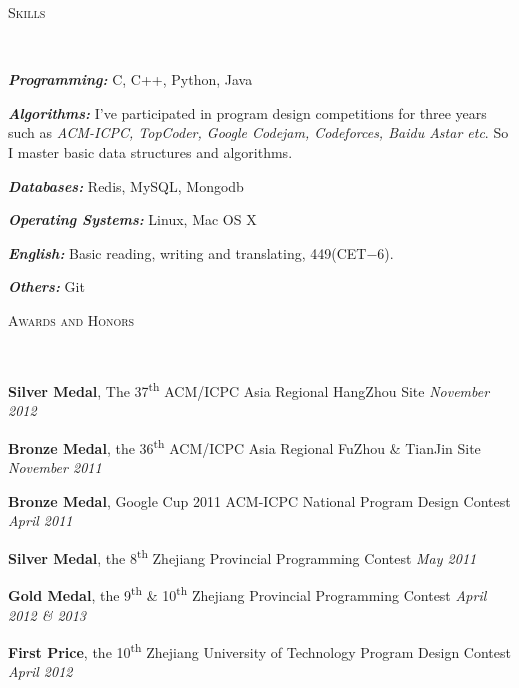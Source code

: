 ﻿\documentclass[9pt]{article}
\newenvironment{changemargin}[2]{%
  \begin{list}{}{%
    \setlength{\topsep}{0pt}%
    \setlength{\leftmargin}{#1}%
    \setlength{\rightmargin}{#2}%
    \setlength{\listparindent}{\parindent}%
    \setlength{\itemindent}{\parindent}%
    \setlength{\parsep}{\parskip}%
  }%
  \item[]}{\end{list}
}
\newcommand{\lineover}{
	\begin{changemargin}{-0.05in}{-0.05in}
		\vspace*{-8pt}
		\hrulefill \\
		\vspace*{-2pt}
	\end{changemargin}
}
\newcommand{\header}[1]{
	\begin{changemargin}{-0.5in}{-0.5in}
		\scshape{#1}\\
  	\lineover
	\end{changemargin}
}
\newenvironment{body} {
	\vspace*{-16pt}
	\begin{changemargin}{-0.25in}{-0.5in}
  }	
	{\end{changemargin}
}
\newcommand\nth{\textsuperscript{th}} %
\begin{document}
\smallskip


\header{Skills}

\begin{body}
	\vspace{14pt}
	\emph{\textbf{Programming:}}{} C, C++, Python, Java \\
	\medskip

    \emph{\textbf{Algorithms:}}{} I've participated in program design competitions for three years such as \emph{ACM-ICPC,
TopCoder, Google Codejam, Codeforces, Baidu Astar etc}. So I master basic data structures and algorithms.\\
    \medskip

    \emph{\textbf{Databases:}}{} Redis, MySQL, Mongodb \\
    \medskip

    \emph{\textbf{Operating Systems:}}{} Linux, Mac OS X \\
    \medskip

    \emph{\textbf{English:}}{} Basic reading, writing and translating, 449(CET$-$6).\\
    \medskip

    \emph{\textbf{Others:}}{} Git

\end{body}

\smallskip

\header{Awards and Honors}

\begin{body}
	\vspace{14pt}

	\textbf{Silver Medal}, The 37\nth{} ACM/ICPC Asia Regional HangZhou Site \hfill{} \emph{November 2012}\\
	\smallskip

	\textbf{Bronze Medal}, the 36\nth{} ACM/ICPC Asia Regional FuZhou \& TianJin Site \hfill{} \emph{November 2011}\\
	\smallskip

	\textbf{Bronze Medal}, Google Cup 2011 ACM-ICPC National Program Design Contest \hfill{} \emph{April 2011}\\
	\smallskip

	\textbf{Silver Medal}, the 8\nth{} Zhejiang Provincial Programming Contest \hfill{} \emph{May 2011}\\
	\smallskip

	\textbf{Gold Medal}, the 9\nth{} \& 10\nth{} Zhejiang Provincial Programming Contest \hfill{} \emph{April 2012 \& 2013}\\
	\smallskip

	\textbf{First Price}, the 10\nth{} Zhejiang University of Technology Program Design Contest \hfill{} \emph{April 2012}\\
\end{body}
\end{document}
